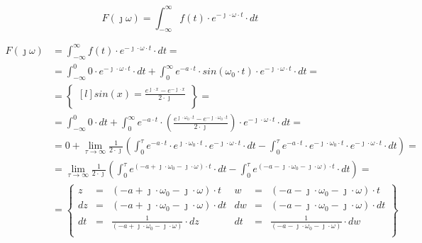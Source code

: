\begin{task}
\begin{equation}
F(\jmath \omega )=\int_{-\infty }^{\infty}f(t) \cdot e^{-\jmath \cdot \omega \cdot t}\cdot dt
\end{equation}


\begin{align*}
F(\jmath \omega )&=\int_{-\infty }^{\infty}f(t) \cdot e^{-\jmath \cdot \omega \cdot t}\cdot dt=\\
&=\int_{-\infty}^{0} 0 \cdot e^{-\jmath \cdot \omega \cdot t}\cdot dt
+\int_{0}^{\infty} e^{-a \cdot t} \cdot sin(\omega_{0} \cdot t) \cdot e^{-\jmath \cdot \omega \cdot t}\cdot dt=\\
&=\begin{Bmatrix*}[l]%
sin(x)=\frac{e^{\jmath \cdot x} - e^{-\jmath \cdot x}}{2 \cdot \jmath}\\
\end{Bmatrix*}=\\
&=\int_{-\infty}^{0} 0 \cdot dt +\int_{0}^{\infty} e^{-a \cdot t} \cdot \left(\frac{e^{\jmath \cdot \omega_{0} \cdot t} - e^{-\jmath \cdot  \omega_{0} \cdot t}}{2 \cdot \jmath} \right) \cdot e^{-\jmath \cdot \omega \cdot t}\cdot dt=\\
&=0 + \lim_{\tau \rightarrow \infty }\frac{1}{2 \cdot \jmath}\left(
\int_{0}^{\tau} e^{-a\cdot t}\cdot e^{\jmath \cdot \omega_{0} \cdot t} \cdot e^{-\jmath \cdot \omega \cdot t} \cdot dt
-\int_{0}^{\tau} e^{-a\cdot t}\cdot e^{-\jmath \cdot \omega_{0} \cdot t} \cdot e^{-\jmath \cdot \omega \cdot t} \cdot dt \right)=\\
&=\lim_{\tau \rightarrow \infty }\frac{1}{2 \cdot \jmath}\left(
\int_{0}^{\tau} e^{(-a + \jmath \cdot \omega_{0} -\jmath \cdot \omega) \cdot t} \cdot dt
-\int_{0}^{\tau} e^{(-a - \jmath \cdot \omega_{0} -\jmath \cdot \omega) \cdot t} \cdot dt \right)=\\
&=\begin{Bmatrix}
z&=&(-a + \jmath \cdot \omega_{0} -\jmath \cdot \omega) \cdot t&w&=&(-a - \jmath \cdot \omega_{0} -\jmath \cdot \omega) \cdot t\\
dz&=&(-a + \jmath \cdot \omega_{0} -\jmath \cdot \omega) \cdot dt&dw&=&(-a - \jmath \cdot \omega_{0} -\jmath \cdot \omega) \cdot dt\\
dt&=&\frac{1}{(-a + \jmath \cdot \omega_{0} -\jmath \cdot \omega)} \cdot dz&dt&=&\frac{1}{(-a - \jmath \cdot \omega_{0} -\jmath \cdot \omega)} \cdot dw\\

\end{Bmatrix}
\end{align*}
\end{task}
